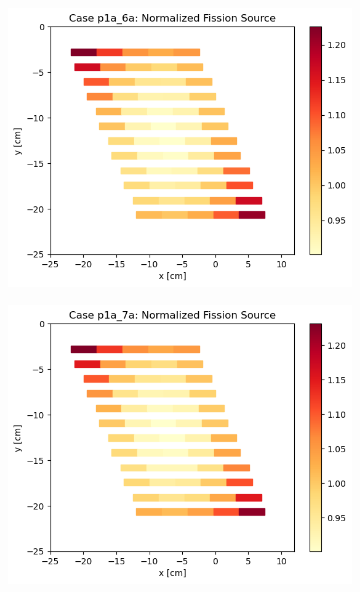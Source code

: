 \documentclass[letterpaper,11pt]{report}
\begin{document}
\begin{figure}[H]
\begin{subfigure}{.33\textwidth}
        \centering
        \includegraphics[width=\linewidth]{../../phase1a/case6a/analysis_output/p1a_6a_c.png}
        \caption{}
      \end{subfigure}
      \begin{subfigure}{.32\textwidth}
        \centering
        \includegraphics[width=\linewidth]{../../phase1a/case7a/analysis_output/p1a_7a_c.png}
        \caption{}
      \end{subfigure}
    \caption{}
    \label{fig:test}
    \end{figure}
\end{document}
